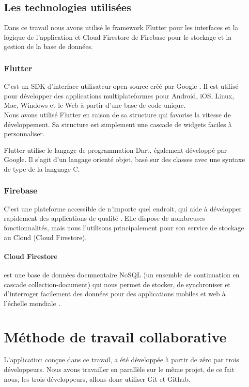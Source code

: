 \documentclass[french, a4paper, 12pt]{report}
\begin{document}
		\subsection{Les technologies utilisées} Dans ce travail nous avons utilisé le framework Flutter pour les interfaces et la logique de l'application et Cloud Firestore de Firebase pour le stockage et la gestion de la base de données.
			\subsubsection*{Flutter} C'est un SDK d'interface utilisateur open-source créé par Google \cite{fltr}. Il est utilisé pour développer des applications multiplateformes pour Android, iOS, Linux, Mac, Windows et le Web à partir d'une base de code unique.\\Nous avons utilisé Flutter en raison de sa structure qui favorise la vitesse de développement. Sa structure est simplement une cascade de widgets faciles à personnaliser.

Flutter utilise le langage de programmation Dart, également développé par Google. Il s'agit d'un langage orienté objet, basé sur des classes avec une syntaxe de type de la language C.
			\subsubsection*{Firebase} C'est une plateforme accessible de n'importe quel endroit, qui aide à développer rapidement des applications de qualité \cite{frbs}. Elle dispose de nombreuses fonctionnalités, mais nous l'utilisons principalement pour son service de stockage au Cloud (Cloud Firestore).\\
				\paragraph*{Cloud Firestore} est une base de données documentaire NoSQL (un ensemble de continuation en cascade collection-document) qui nous permet de stocker, de synchroniser et d'interroger facilement des données pour des applications mobiles et web à l'échelle mondiale \cite{fstr}.
	\section{Méthode de travail collaborative}
		L'application conçue dans ce travail, a été développée à partir de zéro par trois développeurs. Nous avons travailler en parallèle sur le même projet, de ce fait nous, les trois développeurs, allons donc utiliser Git et Github.
\end{document}
